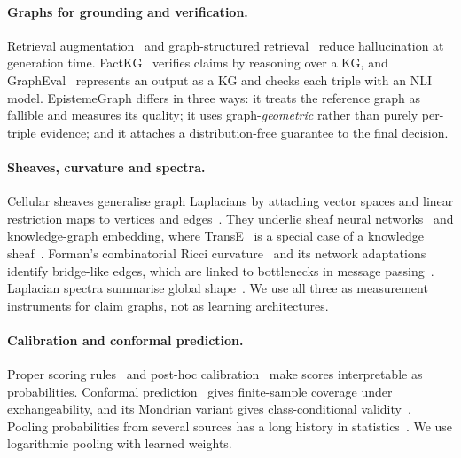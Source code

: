 \documentclass[10pt,twocolumn]{article}
\theoremstyle{remark}
\begin{document}
\paragraph{Graphs for grounding and verification.}
Retrieval augmentation~\cite{lewis2020rag} and graph-structured retrieval~\cite{edge2024graphrag} reduce
hallucination at generation time. FactKG~\cite{kim2023factkg} verifies claims by reasoning over a KG, and
GraphEval~\cite{sansford2024grapheval} represents an output as a KG and checks each triple with an NLI model.
EpistemeGraph differs in three ways: it treats the reference graph as fallible and measures its quality; it uses
graph-\emph{geometric} rather than purely per-triple evidence; and it attaches a distribution-free guarantee to the
final decision.

\paragraph{Sheaves, curvature and spectra.}
Cellular sheaves generalise graph Laplacians by attaching vector spaces and linear restriction maps to vertices and
edges~\cite{hansen2019sheaves}. They underlie sheaf neural networks~\cite{bodnar2022sheaf} and knowledge-graph
embedding, where TransE~\cite{bordes2013transe} is a special case of a knowledge sheaf~\cite{gebhart2023knowledge}.
Forman's combinatorial Ricci curvature~\cite{forman2003bochner} and its network
adaptations~\cite{sreejith2016forman,samal2018comparative} identify bridge-like edges, which are linked to
bottlenecks in message passing~\cite{topping2022oversquashing}. Laplacian spectra summarise global
shape~\cite{chung1997spectral}. We use all three as measurement instruments for claim graphs, not as learning
architectures.

\paragraph{Calibration and conformal prediction.}
Proper scoring rules~\cite{gneiting2007scoring} and post-hoc calibration~\cite{platt1999probabilistic,guo2017calibration}
make scores interpretable as probabilities. Conformal prediction~\cite{vovk2005algorithmic,lei2018distribution,angelopoulos2023gentle}
gives finite-sample coverage under exchangeability, and its Mondrian variant gives class-conditional
validity~\cite{vovk2012conditional}. Pooling probabilities from several sources has a long history in
statistics~\cite{genest1986combining}. We use logarithmic pooling with learned weights.
\end{document}
